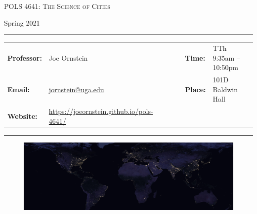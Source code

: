 \documentclass[11pt, letterpaper]{article}
\begin{document}
\begin{center}
{\Large \textsc{POLS 4641: The Science of Cities}}
\end{center}
\begin{center}
{\large Spring 2021}
\end{center}

\begin{center}
\rule{6.5in}{0.4pt}
\begin{minipage}[t]{.96\textwidth}
\begin{tabular}{llcccll}
\textbf{Professor:} & Joe Ornstein & & &  & \textbf{Time:} & TTh 9:35am -- 10:50pm \\
\textbf{Email:} &  \href{mailto:jornstein@uga.edu}{jornstein@uga.edu} & & & & \textbf{Place:} & 101D Baldwin Hall\\
\textbf{Website:} & \href{https://joeornstein.github.io/pols-4641/}{https://joeornstein.github.io/pols-4641/} & & & & &
\end{tabular}
\end{minipage}
\rule{6.5in}{0.4pt}
\end{center}
\vspace{.15cm}
\setlength{\unitlength}{1in}
\renewcommand{\arraystretch}{2}

\begin{figure}[h]
	\centering
	\includegraphics[width = 1.03\textwidth]{img/night-lights-cropped.jpg}
\end{figure}


\onehalfspacing

\end{document}
